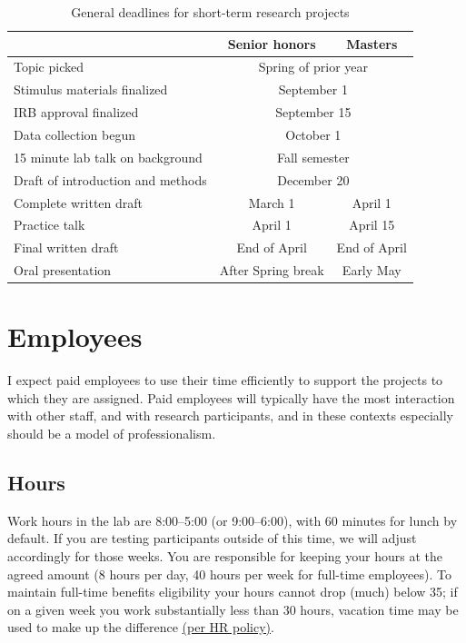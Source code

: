 \documentclass[letterpaper,11pt,oneside]{memoir}
\begin{document}
\begin{table}
\centering
\caption{General deadlines for short-term research projects}
\begin{tabular}{lcc}
\toprule
& Senior honors & Masters\\
\midrule
Topic picked& \multicolumn{2}{c}{Spring of prior year}\\
Stimulus materials finalized& \multicolumn{2}{c}{September 1}\\
IRB approval finalized& \multicolumn{2}{c}{September 15}\\
Data collection begun& \multicolumn{2}{c}{October 1}\\
15 minute lab talk on background& \multicolumn{2}{c}{Fall semester}\\
Draft of introduction and methods& \multicolumn{2}{c}{December 20}\\
Complete written draft& March 1& April 1\\
Practice talk& April 1 & April 15\\
Final written draft& End of April & End of April\\
Oral presentation& After Spring break & Early May\\
\bottomrule
\end{tabular}
\label{table:deadlines}
\end{table}


\section{Employees}

I expect paid employees to use their time efficiently to support the projects to which they are assigned. Paid employees will typically have the most interaction with other staff, and with research participants, and in these contexts especially should be a model of professionalism.

\subsection{Hours}
Work hours in the lab are 8:00--5:00 (or 9:00--6:00), with 60 minutes for lunch by default. If you are testing participants outside of this time, we will adjust accordingly for those weeks. You are responsible for keeping your hours at the agreed amount (8 hours per day, 40 hours per week for full-time employees). To maintain full-time benefits eligibility your hours cannot drop (much) below 35; if on a given week you work substantially less than 30 hours, vacation time may be used to make up the difference \href{http://www.temple.edu/hr/departments/employeerelations/documents/Employee_Manual_Feb_2016.pdf}{(per HR policy)}.
\end{document}

